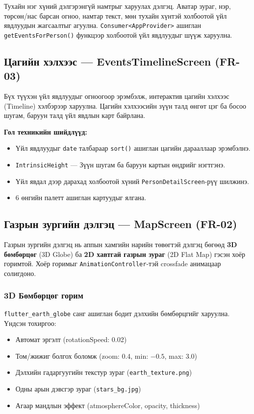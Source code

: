 Тухайн нэг хүний дэлгэрэнгүй намтрыг харуулах дэлгэц. Аватар зураг, нэр, төрсөн/нас барсан огноо, намтар текст, мөн тухайн хүнтэй холбоотой үйл явдлуудын жагсаалтыг агуулна. \texttt{Consumer<AppProvider>} ашиглан \texttt{getEventsForPerson()} функцээр холбоотой үйл явдлуудыг шүүж харуулна.

\subsection{Цагийн хэлхээс — EventsTimelineScreen (FR-03)}

Бүх түүхэн үйл явдлуудыг огноогоор эрэмбэлж, интерактив цагийн хэлхээс (Timeline) хэлбэрээр харуулна. Цагийн хэлхээсийн зүүн талд өнгөт цэг ба босоо шугам, баруун талд үйл явдлын карт байрлана.

\textbf{Гол техникийн шийдлүүд:}
\begin{itemize}
	\item Үйл явдлуудыг \texttt{date} талбараар \texttt{sort()} ашиглан цагийн дарааллаар эрэмбэлнэ.
	\item \texttt{IntrinsicHeight} — Зүүн шугам ба баруун картын өндрийг нэгтгэнэ.
	\item Үйл явдал дээр дарахад холбоотой хүний \texttt{PersonDetailScreen}-рүү шилжинэ.
	\item 6 өнгийн палетт ашиглан картуудыг ялгана.
\end{itemize}

\subsection{Газрын зургийн дэлгэц — MapScreen (FR-02)}

Газрын зургийн дэлгэц нь аппын хамгийн нарийн төвөгтэй дэлгэц бөгөөд \textbf{3D бөмбөрцөг} (3D Globe) ба \textbf{2D хавтгай газрын зураг} (2D Flat Map) гэсэн хоёр горимтой. Хоёр горимыг \texttt{AnimationController}-тэй crossfade анимацаар солигдоно.

\subsubsection{3D Бөмбөрцөг горим}

\texttt{flutter\_earth\_globe} санг ашиглан бодит дэлхийн бөмбөрцгийг харуулна. Үндсэн тохиргоо:

\begin{itemize}
	\item Автомат эргэлт (rotationSpeed: 0.02)
	\item Том/жижиг болгох боломж (zoom: 0.4, min: $-0.5$, max: 3.0)
	\item Дэлхийн гадаргуугийн текстур зураг (\texttt{earth\_texture.png})
	\item Одны арын дэвсгэр зураг (\texttt{stars\_bg.jpg})
	\item Агаар мандлын эффект (atmosphereColor, opacity, thickness)
\end{itemize}

